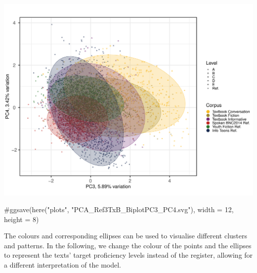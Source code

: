 \documentclass[
  letterpaper,
  DIV=11,
  numbers=noendperiod]{scrreprt}
\newenvironment{Shaded}{\begin{snugshade}}{\end{snugshade}}
\newcommand{\CommentTok}[1]{\textcolor[rgb]{0.37,0.37,0.37}{#1}}
\begin{document}
\includegraphics{G_Ch7_Analysis_files/figure-pdf/PCAtools-biplots-TxB-2.pdf}

\begin{Shaded}
\begin{Highlighting}[]
\CommentTok{\#ggsave(here("plots", "PCA\_Ref3TxB\_BiplotPC3\_PC4.svg"), width = 12, height = 8)}
\end{Highlighting}
\end{Shaded}

The colours and corresponding ellipses can be used to visualise
different clusters and patterns. In the following, we change the colour
of the points and the ellipses to represent the texts' target
proficiency levels instead of the register, allowing for a different
interpretation of the model.
\end{document}
